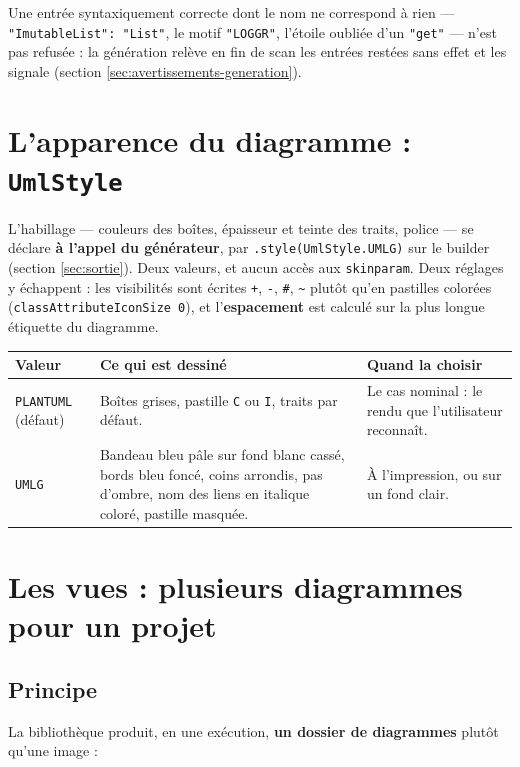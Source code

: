 \documentclass[12pt, a4paper]{article}
\begin{document}
Une entrée syntaxiquement correcte dont le nom ne correspond à rien --- \texttt{"ImutableList": "List"}, le motif \texttt{"LOGGR"}, l'étoile oubliée d'un \texttt{"get"} --- n'est pas refusée : la génération relève en fin de scan les entrées restées sans effet et les signale (section \ref{sec:avertissements-generation}).

\section{L'apparence du diagramme : \texttt{UmlStyle}}
\label{sec:style}

L'habillage --- couleurs des boîtes, épaisseur et teinte des traits, police --- se déclare \textbf{à l'appel du générateur}, par \texttt{.style(UmlStyle.UMLG)} sur le builder (section \ref{sec:sortie}). Deux valeurs, et aucun accès aux \texttt{skinparam}. Deux réglages y échappent : les visibilités sont écrites \texttt{+}, \texttt{-}, \texttt{\#}, \texttt{\textasciitilde} plutôt qu'en pastilles colorées (\texttt{classAttributeIconSize 0}), et l'\textbf{espacement} est calculé sur la plus longue étiquette du diagramme.

\begin{center}
\begin{tabular}{@{}L{2.9cm}L{6.0cm}L{7.6cm}@{}}
\hline
\textbf{Valeur} & \textbf{Ce qui est dessiné} & \textbf{Quand la choisir} \\
\hline
\texttt{PLANTUML} \newline \small(défaut) & Boîtes grises, pastille \texttt{C} ou \texttt{I}, traits par défaut. & Le cas nominal : le rendu que l'utilisateur reconnaît. \\[0.4em]
\texttt{UMLG} & Bandeau bleu pâle sur fond blanc cassé, bords bleu foncé, coins arrondis, pas d'ombre, nom des liens en italique coloré, pastille masquée. & À l'impression, ou sur un fond clair. \\
\hline
\end{tabular}
\end{center}

\section{Les vues : plusieurs diagrammes pour un projet}
\label{sec:vues}

\subsection{Principe}
La bibliothèque produit, en une exécution, \textbf{un dossier de diagrammes} plutôt qu'une image :
\end{document}
